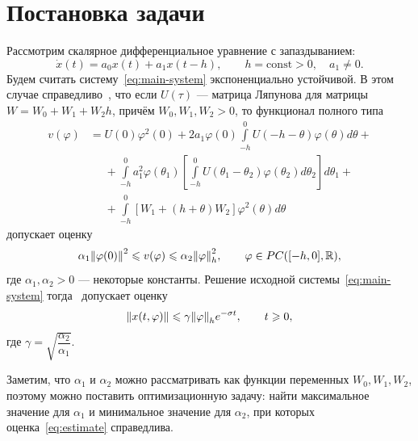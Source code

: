 \documentclass[a4paper,14pt]{article}
\begin{document}
\section{Постановка задачи}
Рассмотрим скалярное дифференциальное уравнение с запаздыванием:
\begin{equation}
  \label{eq:main-system}
  \dot x(t) = a_0 x(t) + a_1 x(t - h),
  \qquad h = \mathrm{const} > 0,
  \quad a_1 \neq 0.
\end{equation}
Будем считать систему~\eqref{eq:main-system} экспоненциально устойчивой.
В этом случае справедливо~\cite[стр.~66]{kharitonov2013}, что если
$U(\tau)$ --- матрица Ляпунова для матрицы $W = W_0 + W_1 + W_2 h$, причём
$W_0, W_1, W_2 > 0$, то функционал полного типа
\begin{equation*}
  \begin{aligned}
    v(\varphi)
    &=
      U(0) \varphi^2(0)
      +
      2 a_1 \varphi(0) \int\limits_{-h}^{0} U(-h - \theta) \varphi(\theta) d\theta
      + \\
    &\phantom{=}
      +
      \int\limits_{-h}^{0} a_1^2 \varphi(\theta_1) \left[
      \int\limits_{-h}^{0} U(\theta_1 - \theta_2) \varphi(\theta_2) d\theta_2
      \right] d\theta_1
      + \\
    &\phantom{=}
      +
      \int\limits_{-h}^{0} \left[
      W_1 + (h + \theta) W_2
      \right] \varphi^2(\theta) d\theta
  \end{aligned}
\end{equation*}
допускает оценку
\begin{equation}
  \label{eq:estimate}
  \alpha_1 \norm{\varphi(0)}^2
  \leqslant
  v(\varphi)
  \leqslant
  \alpha_2 \norm{\varphi}_h^2,
  \qquad
  \varphi \in PC([-h, 0], \mathbb{R}),
\end{equation}
где $\alpha_1, \alpha_2 > 0$ --- некоторые константы. Решение исходной
системы~\eqref{eq:main-system} тогда~\cite[стр.~67]{kharitonov2013} допускает
оценку
\begin{equation*}
  \norm{x(t, \varphi)} \leqslant \gamma \norm{\varphi}_h e^{-\sigma t},
  \qquad t \geqslant 0,
\end{equation*}
где $\gamma = \sqrt{\dfrac{\alpha_2}{\alpha_1}}$.

Заметим, что $\alpha_1$ и $\alpha_2$ можно рассматривать как функции переменных
$W_0, W_1, W_2$, поэтому можно поставить оптимизационную задачу: найти
максимальное значение для $\alpha_1$ и минимальное значение для $\alpha_2$, при
которых оценка~\eqref{eq:estimate} справедлива.
\end{document}
